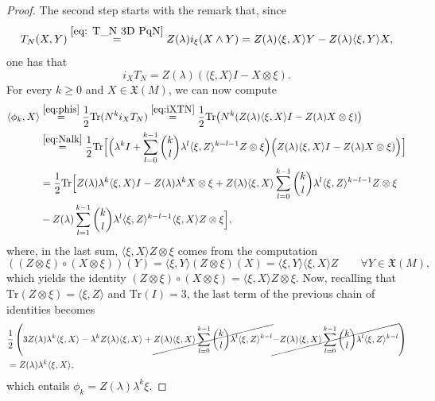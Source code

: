 \documentclass[10pt,a4paper]{amsart}
\begin{document}
\begin{proof}
The second step starts with the remark that, since
	\[
	T_N(X,Y)\stackrel{\eqref{eq: T_N 3D PqN}}{=}Z(\lambda)i_\xi(X\wedge Y)=Z(\lambda)\langle\xi,X\rangle Y-Z(\lambda)\langle\xi,Y\rangle X,
	\]
	one has that
	\begin{equation}
		i_XT_N=Z(\lambda)(\langle\xi,X\rangle I-X\otimes\xi).\label{eq:iXTN}
	\end{equation}
	For every $k\geq 0$ and $X\in\mathfrak X(M)$, we can now compute
	\[
	\begin{split}
		\langle\phi_k,X\rangle&\stackrel{%
			\eqref{eq:phis}}{=}\frac12\text{Tr}(N^ki_XT_N)\stackrel{\eqref{eq:iXTN}}
		{=}\frac12\text{Tr}\big(N^k(Z(\lambda)\langle\xi,X\rangle I-Z(\lambda)X\otimes\xi)\big)\\
		&\stackrel{\eqref{eq:Nalk}}{=}\frac12\text{Tr}\Big[\Big(\lambda^kI+\sum_{l=0}^{k-1}{k\choose l}\lambda^l\langle\xi,Z\rangle^{k-l-1}Z\otimes\xi \Big)\Big(Z(\lambda)\langle\xi,X\rangle I-Z(\lambda)X\otimes\xi)\Big)\Big]\\
		&=\frac12\text{Tr}\Big[Z(\lambda)\lambda^k\langle\xi,X\rangle I-Z(\lambda)\lambda^kX\otimes\xi+Z(\lambda)\langle\xi,X\rangle\sum_{l=0}^{k-1}{k\choose l}\lambda^l\langle\xi,Z\rangle^{k-l-1}Z\otimes\xi\\
		&-Z(\lambda)\sum_{l=1}^{k-1}{k\choose l}\lambda^l\langle\xi,Z\rangle^{k-l-1}\langle\xi,X\rangle Z\otimes\xi\Big],
	\end{split}
	\]
	where, in the last sum, $\langle\xi,X\rangle Z\otimes\xi$ comes from the  computation
	\[
	\left((Z\otimes\xi)\circ (X\otimes\xi)\right)(Y)=\langle\xi,Y\rangle(Z\otimes\xi)(X)=\langle\xi,Y\rangle\langle\xi,X\rangle Z%
	\qquad\forall Y\in\mathfrak X(M),
	\]
	which yields the identity $(Z\otimes\xi)\circ(X\otimes\xi)=\langle\xi,X\rangle Z\otimes\xi$. Now, recalling that $\text{Tr}(Z\otimes\xi)=\langle\xi,Z\rangle$ and $\text{Tr}(I)=3$, the last term of the previous chain of identities becomes
	\[
	\begin{split}
		&\frac12\left(3Z(\lambda)\lambda^k\langle\xi,X\rangle-\lambda^kZ(\lambda)\langle\xi,X\rangle+\cancel{Z(\lambda)\langle\xi,X\rangle\sum_{l=0}^{k-1}{k\choose l}\lambda^l\langle\xi,Z\rangle^{k-l}}\cancel{-Z(\lambda)\langle\xi,X\rangle\sum_{l=0}^{k-1}{k\choose l}\lambda^l\langle\xi,Z\rangle^{k-l}}
		\right)\\
		&=Z(\lambda)\lambda^k\langle\xi,X\rangle,
	\end{split}
	\]
	which entails $\phi_k=Z(\lambda)\lambda^k\xi$.
\end{proof}
\end{document}
